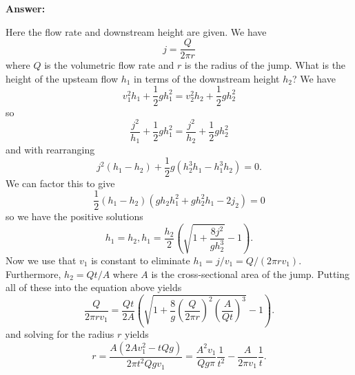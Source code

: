 \documentclass{article}
\begin{document}
\begin{enumerate}
{\bf Answer:}

Here the flow rate and downstream height are given.  We have
\begin{equation}
  j = \frac{Q}{2 \pi r}
\end{equation}
where $Q$ is the volumetric flow rate and $r$ is the radius of the
jump.  What is the height of the upsteam flow $h_1$ in terms of the
downstream height $h_2$?  We have
\begin{equation}
v_1^2 h_1 + \frac{1}{2} g h_1^2 = v_2^2 h_2 + \frac{1}{2} g h_2^2
\end{equation}
so
\begin{equation}
\frac{j^2}{h_1} + \frac{1}{2} g h_1^2 = \frac{j^2}{h_2} + \frac{1}{2} g h_2^2
\end{equation}
and with rearranging
\begin{equation}
j^2 \left ( h_1 - h_2 \right ) + \frac{1}{2} g \left ( h_2^3 h_1 -
  h_1^3 h_2 \right ) = 0.
\end{equation}
We can factor this to give
\begin{equation}
\frac{1}{2} \left( h_1 - h_2 \right ) \left ( g h_2 h_1^2  + g h_2^2 h_1 - 2
    j_2 \right ) = 0
\end{equation}
so we have the positive solutions
\begin{equation}
h_1 = h_2, h_1 = \frac{h_2}{2} \left ( \sqrt{ 1 + \frac{8 j^2}{g
      h_2^3}} - 1 \right ).
\end{equation}
Now we use that $v_1$ is constant to eliminate $h_1=j/v_1=Q/(2\pi r
v_1)$.  Furthermore, $h_2=Q t/A$ where $A$ is the cross-sectional area
of the jump.  Putting all of these into the equation above yields
\begin{equation}
\frac{Q}{2\pi r v_1} = \frac{Q t}{2 A} \left ( \sqrt{ 1 + 
\frac{8}{g} \left (\frac{Q}{2\pi r} \right )^2 \left ( \frac{A}{Q t} \right)^3
} - 1 \right ).
\end{equation}
and solving for the radius $r$ yields
\begin{equation}
r = \frac{A \left ( 2 A v_1^2 - t Q g \right )}{2 \pi t^2 Q g  v_1} 
= \frac{A^2 v_1}{Q g \pi} \frac{1}{t^2} - \frac{A}{2\pi v_1} \frac{1}{t}.
\end{equation}
\end{enumerate}

\ifx\bookloaded\undefined
\end{document}
